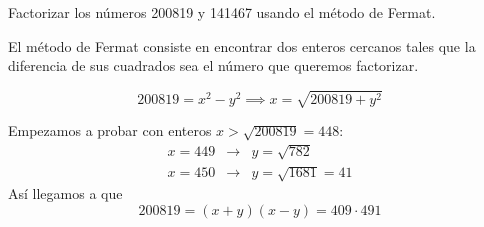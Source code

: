 \begin{problem}[4]
 Factorizar los n\'umeros 200819 y 141467 usando el m\'etodo de Fermat.
\solution


El método de Fermat consiste en encontrar dos enteros cercanos tales que la diferencia de sus cuadrados sea el número que queremos factorizar.

\[200819 = x^2 - y^2 \implies x = \sqrt{200819+y^2}\]

Empezamos a probar con enteros $x>\sqrt{200819}=448$:
\[\begin{array}{lcl}
x=449 & \to & y=\sqrt{782}\\
x=450 & \to & y=\sqrt{1681} = 41
\end{array}\]
Así llegamos a que 
\[200819 = (x+y)(x-y) = 409 \cdot 491\]


\end{problem}
